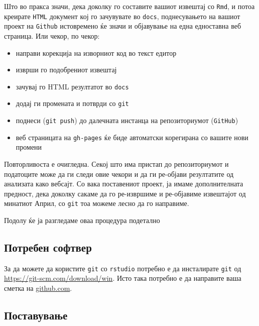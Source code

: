 \documentclass[
]{book}
\providecommand{\tightlist}{%
  \setlength{\itemsep}{0pt}\setlength{\parskip}{0pt}}
\begin{document}
Што во пракса значи, дека доколку го составите вашиот извештај со \texttt{Rmd}, и потоа креирате \texttt{HTML} документ кој го зачувувате во \texttt{docs}, поднесувањето на вашиот проект на \texttt{Github} истовремено ќе значи и објавување на една едноставна веб страница. Или чекор, по чекор:

\begin{itemize}
\tightlist
\item
  направи корекција на изворниот код во текст едитор
\item
  изврши го подобрениот извештај
\item
  зачувај го HTML резултатот во \texttt{docs}
\item
  додај ги промената и потврди со \texttt{git}
\item
  поднеси (\texttt{git\ push}) до далечната инстанца на репозиториумот (\texttt{GitHub})
\item
  веб страницата на \texttt{gh-pages} ќе биде автоматски корегирана со вашите нови промени
\end{itemize}

Повторливоста е очигледна. Секој што има пристап до репозиториумот и податоците може да ги следи овие чекори и да ги ре-објави резултатите од анализата како вебсајт. Со вака поставениот проект, ја имаме дополнителната предност, дека доколку сакаме да го ре-извршиме и ре-објавиме извештајот од минатиот Април, со \texttt{git} тоа можеме лесно да го направиме.

Подолу ќе ја разгледаме оваа процедура подетално

\hypertarget{ux43fux43eux442ux440ux435ux431ux435ux43d-ux441ux43eux444ux442ux432ux435ux440}{%
\subsection{Потребен софтвер}\label{ux43fux43eux442ux440ux435ux431ux435ux43d-ux441ux43eux444ux442ux432ux435ux440}}

За да можете да користите \texttt{git} со \texttt{rstudio} потребно е да инсталирате \texttt{git} од \url{https://git-scm.com/download/win}. Исто така потребно е да направите ваша сметка на \href{https://github.com}{github.com}.

\hypertarget{ux43fux43eux441ux442ux430ux432ux443ux432ux430ux45aux435-1}{%
\subsection{Поставување}\label{ux43fux43eux441ux442ux430ux432ux443ux432ux430ux45aux435-1}}
\end{document}
